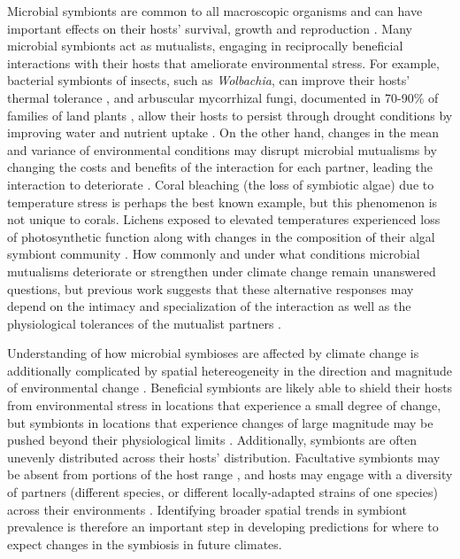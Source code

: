 \documentclass[11pt]{article}
\let\cite\citep
\begin{document}
Microbial symbionts are common to all macroscopic organisms and can have important effects on their hosts' survival, growth and reproduction \cite{rodriguez2009fungal,mcfall2013animals}.
Many microbial symbionts act as mutualists, engaging in reciprocally beneficial interactions with their hosts that ameliorate environmental stress. 
For example, bacterial symbionts of insects, such as \emph{Wolbachia}, can improve their hosts' thermal tolerance \citep{truitt2019wolbachia, renoz2019evolutionary}, and arbuscular mycorrhizal fungi, documented in 70-90\% of families of land plants \citep{parniske2008arbuscular}, allow their hosts to persist through drought conditions by improving water and nutrient uptake \citep{cheng2021elucidating}.
On the other hand, changes in the mean and variance of environmental conditions may disrupt microbial  mutualisms by changing the costs and benefits of the interaction for each partner, leading the interaction to deteriorate \citep{aslan2013mutualism}. 
Coral bleaching (the loss of symbiotic algae) due to temperature stress \citep{sully2019global} is perhaps the best known example, but this phenomenon is not unique to corals.
Lichens exposed to elevated temperatures experienced loss of photosynthetic function along with changes in the composition of their algal symbiont community \citep{meyer2022climate}.
How commonly and under what conditions microbial mutualisms deteriorate or strengthen under climate change remain unanswered questions, but previous work suggests that these alternative responses may depend on the intimacy and specialization of the interaction as well as the physiological tolerances of the mutualist partners \citep{toby2010mutualisms, warren2014mutualism, rafferty2015phenological}. 

Understanding of how microbial symbioses are affected by climate change is additionally complicated by spatial hetereogeneity in the direction and magnitude of environmental change \cite{ipcc_2021}. 
Beneficial symbionts are likely able to shield their hosts from environmental stress in locations that experience a small degree of change, but symbionts in locations that experience changes of large magnitude may be pushed beyond their physiological limits \cite{webster2008temperature}.
Additionally, symbionts are often unevenly distributed across their hosts' distribution.
Facultative symbionts may be absent from portions of the host range \cite{afkhami2014mutualist}, and hosts may engage with a diversity of partners (different species, or different locally-adapted strains of one species) across their environments \cite{frade2008variation, rolshausen2018quantifying}.
Identifying broader spatial trends in symbiont prevalence is therefore an important step in developing predictions for where to expect changes in the symbiosis in future climates.
\end{document}
